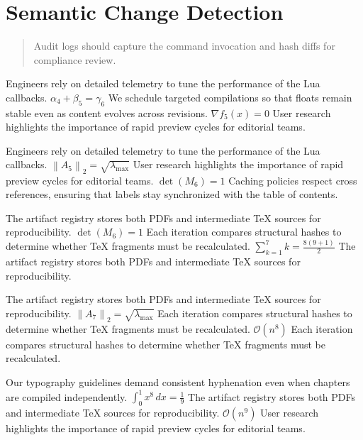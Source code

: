     \section{Semantic Change Detection}
    
    \begin{quote}
      Audit logs should capture the command invocation and hash diffs for compliance review.
    \end{quote}
  
    Engineers rely on detailed telemetry to tune the performance of the Lua callbacks.  $\alpha_{4} + \beta_{5} = \gamma_{6}$  We schedule targeted compilations so that floats remain stable even as content evolves across revisions.  $\nabla f_{5}(x) = 0$  User research highlights the importance of rapid preview cycles for editorial teams.
    \par
  
    Engineers rely on detailed telemetry to tune the performance of the Lua callbacks.  $\left\|A_{5}\right\|_{2} = \sqrt{\lambda_{\max}}$  User research highlights the importance of rapid preview cycles for editorial teams.  $\det(M_{6}) = 1$  Caching policies respect cross references, ensuring that labels stay synchronized with the table of contents.
    \par
  
    The artifact registry stores both PDFs and intermediate TeX sources for reproducibility.  $\det(M_{6}) = 1$  Each iteration compares structural hashes to determine whether TeX fragments must be recalculated.  $\sum_{k=1}^{7} k = \frac{8(9+1)}{2}$  The artifact registry stores both PDFs and intermediate TeX sources for reproducibility.
    \par
  
    The artifact registry stores both PDFs and intermediate TeX sources for reproducibility.  $\left\|A_{7}\right\|_{2} = \sqrt{\lambda_{\max}}$  Each iteration compares structural hashes to determine whether TeX fragments must be recalculated.  $\mathcal{O}(n^{8})$  Each iteration compares structural hashes to determine whether TeX fragments must be recalculated.
    \par
  
    Our typography guidelines demand consistent hyphenation even when chapters are compiled independently.  $\int_{0}^{1} x^{8} \, dx = \frac{1}{9}$  The artifact registry stores both PDFs and intermediate TeX sources for reproducibility.  $\mathcal{O}(n^{9})$  User research highlights the importance of rapid preview cycles for editorial teams.
    \par
  
